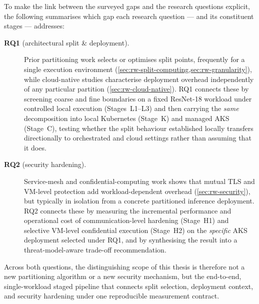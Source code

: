 To make the link between the surveyed gaps and the research questions explicit, the
following summarises which gap each research question --- and its constituent stages ---
addresses:

\begin{description}
    \item[\textbf{RQ1} (architectural split \& deployment).] Prior partitioning work
    selects or optimises split points, frequently for a single execution environment
    (\cref{sec:rw-split-computing,sec:rw-granularity}), while cloud-native studies
    characterise deployment overhead independently of any particular partition
    (\cref{sec:rw-cloud-native}). RQ1 connects these by screening coarse and fine
    boundaries on a fixed ResNet-18 workload under controlled local execution
    (Stages~L1--L3) and then carrying the \emph{same} decomposition into local Kubernetes
    (Stage~K) and managed AKS (Stage~C), testing whether the split behaviour established
    locally transfers directionally to orchestrated and cloud settings rather than
    assuming that it does.
    \item[\textbf{RQ2} (security hardening).] Service-mesh and confidential-computing work
    shows that mutual TLS and VM-level protection add workload-dependent overhead
    (\cref{sec:rw-security}), but typically in isolation from a concrete partitioned
    inference deployment. RQ2 connects these by measuring the incremental performance and
    operational cost of communication-level hardening (Stage~H1) and selective VM-level
    confidential execution (Stage~H2) on the \emph{specific} AKS deployment selected under
    RQ1, and by synthesising the result into a threat-model-aware trade-off recommendation.
\end{description}

Across both questions, the distinguishing scope of this thesis is therefore not a new
partitioning algorithm or a new security mechanism, but the end-to-end, single-workload
staged pipeline that connects split selection, deployment context, and security hardening
under one reproducible measurement contract.
